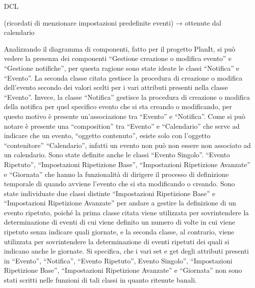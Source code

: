 \begin{listaPersonale}{DCL}
\begin{listaPersonale2}[DCL]{}
            


        (ricordati di menzionare impostazioni predefinite eventi) → ottenute dal calendario

        Analizzando il diagramma di componenti, fatto per il progetto PlanIt, si può vedere la presenza dei componenti “Gestione creazione o modifica evento” e “Gestione notifiche”, per questa ragione sono state ideate le classi “Notifica” e “Evento”. La seconda classe citata gestisce la procedura di creazione o modifica dell'evento secondo dei valori scelti per i vari attributi presenti nella classe “Evento”. Invece, la classe “Notifica” gestisce la procedura di creazione o modifica della notifica per quel specifico evento che si sta creando o modificando, per questo motivo è presente un'associazione tra “Evento” e “Notifica”.
        Come si può notare è presente una “composition” tra “Evento” e “Calendario” che serve ad indicare che un evento, “oggetto contenuto”, esiste solo con l'oggetto “contenitore” “Calendario”, infatti un evento non può non essere non associato ad un calendario.
        Sono state definite anche le classi “Evento Singolo”. “Evento Ripetuto”, “Impostazioni Ripetizione Base”, “Impostazioni Ripetizione Avanzate” e “Giornata” che hanno la funzionalità di dirigere il processo di definizione temporale di quando avviene l'evento che si sta modificando o creando. Sono state individuate due classi distinte “Impostazioni Ripetizione Base” e “Impostazioni Ripetizione Avanzate” per andare a gestire la definizione di un evento ripetuto, poiché la prima classe citata viene utilizzata per sovrintendere la determinazione di eventi di cui viene definito un numero di volte in cui viene ripetuto senza indicare quali giornate, e la seconda classe, al contrario, viene utilizzata per sovrintendere la determinazione di eventi ripetuti dei quali si indicano anche le giornate.
        Si specifica, che i vari set e get degli attributi presenti in “Evento”, “Notifica”, “Evento Ripetuto”, Evento Singolo”, “Impostazioni Ripetizione Base”, “Impostazioni Ripetizione Avanzate” e “Giornata” non sono stati scritti nelle funzioni di tali classi in quanto ritenute banali.
        
        
            \begin{center}
                
            \end{center}
        

\end{listaPersonale2}
\end{listaPersonale}
